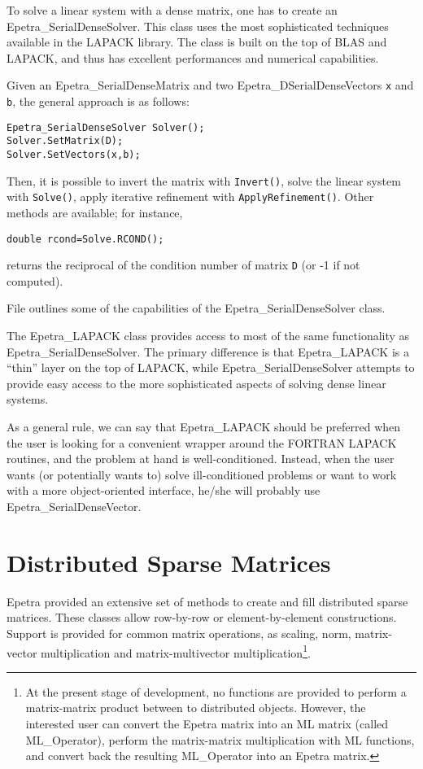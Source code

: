 \smallskip

To solve a linear system with a dense matrix, one has to create an
Epetra\_SerialDenseSolver. This class uses the most sophisticated
techniques available in the LAPACK library. The class is
built on the top of BLAS and LAPACK, and thus has excellent performances
and numerical capabilities.

Given an Epetra\_SerialDenseMatrix and two Epetra\_DSerialDenseVectors
{\tt x} and {\tt b}, the general approach is as follows:
\begin{verbatim}
Epetra_SerialDenseSolver Solver();
Solver.SetMatrix(D);
Solver.SetVectors(x,b);
\end{verbatim}
Then, it is possible to invert the matrix with \verb!Invert()!, solve
the linear system with \verb!Solve()!, apply iterative refinement with
\verb!ApplyRefinement()!. Other methods are available; for instance,
\begin{verbatim}
double rcond=Solve.RCOND();
\end{verbatim}
returns the reciprocal of the condition number of matrix {\tt D} (or -1
if not computed).

File  outlines some of the capabilities of the
Epetra\_SerialDenseSolver class.

\smallskip

The Epetra\_LAPACK class provides access to most of the same
functionality as Epetra\_SerialDenseSolver. The primary difference is
that Epetra\_LAPACK is a ``thin'' layer on the top of LAPACK, while
Epetra\_SerialDenseSolver attempts to provide easy access to the more
sophisticated aspects of solving dense linear systems.

As a general rule, we can say that Epetra\_LAPACK should be preferred
when the user is looking for a convenient wrapper around the FORTRAN
LAPACK routines, and the problem at hand is well-conditioned. Instead,
when the user wants (or potentially wants to) solve ill-conditioned
problems or want to work with a more object-oriented interface, he/she
will probably use Epetra\_SerialDenseVector.


\section{Distributed Sparse Matrices}
\label{sec:sparse_mat}

Epetra provided an extensive set of methods to create and fill
distributed sparse matrices. These classes allow row-by-row or
element-by-element constructions. Support is provided for common matrix
operations, as scaling, norm, matrix-vector multiplication and
matrix-multivector multiplication\footnote{At the present stage of
  development, no functions are provided to perform a matrix-matrix
  product between to distributed objects. However, the interested user
  can convert the Epetra matrix into an ML matrix (called ML\_Operator),
  perform the matrix-matrix multiplication with ML functions, and
  convert back the resulting ML\_Operator into an Epetra matrix.}.

